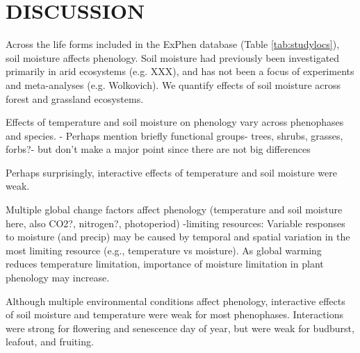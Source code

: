 \documentclass{article}
\begin{document}
\section* {DISCUSSION}
\par  Across the life forms included in the ExPhen database (Table \ref{tab:studylocs}), soil moisture affects phenology. Soil moisture had previously been investigated primarily in arid ecosystems (e.g. XXX), and has not been a focus of experiments and meta-analyses (e.g. Wolkovich). We quantify effects of soil moisture across forest and grassland ecosystems.

\par Effects of temperature and soil moisture on phenology vary across phenophases and species.
- Perhaps mention briefly functional groups- trees, shrubs, grasses, forbs?- but don't make a major point since there are not big differences

\par Perhaps surprisingly, interactive effects of temperature and soil moisture were weak.

\par Multiple global change factors affect phenology (temperature and soil moisture here, also CO2?, nitrogen?, photoperiod)
 -limiting resources: Variable responses to moisture (and precip) may be caused by temporal and spatial variation in the most limiting resource (e.g., temperature vs moisture). As global warming reduces temperature limitation, importance of moisture limitation in plant phenology may increase. 

\par Although multiple environmental conditions affect phenology,  interactive effects of soil moisture and temperature were weak for most phenophases. Interactions were strong for flowering and senescence day of year, but were weak for budburst, leafout, and fruiting. 
\end{document}
